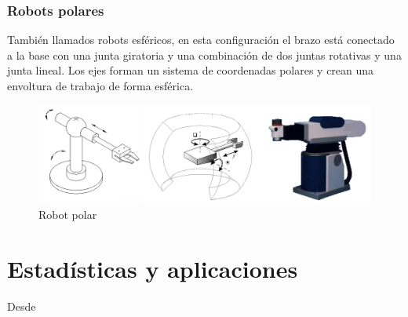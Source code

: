         \subsubsection{Robots polares}
        
        También llamados robots esféricos, en esta configuración el brazo está conectado a la base con una junta giratoria y una combinación de dos juntas rotativas y una junta lineal. Los ejes forman un sistema de coordenadas polares y crean una envoltura de trabajo de forma esférica.
        
        \begin{figure}[htb]
            \centering
            \includegraphics[width=0.9\linewidth]{Main/Chapter2/Images2/robot-polar.png}
            \caption{Robot polar}
            \label{f:Cap2_segunMovimiento_polar}
        \end{figure}
    
                \newpage

    
\section{Estadísticas y aplicaciones}
    Desde
    
